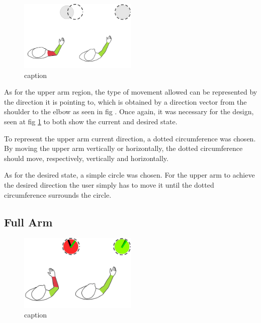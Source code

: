 \begin{figure}[!t]
    \begin{center}
        \includegraphics[width=0.5\textwidth]{imgs/upperarmfeedback.png}
    \end{center}
    \caption{caption}
    \label{fig:upperarmfeedback}
\end{figure}

As for the upper arm region, the type of movement allowed can be represented by the direction it is pointing to, which is obtained by a direction vector from the shoulder to the elbow as seen in fig .
Once again, it was necessary for the design, seen at fig \ref{fig:upperarmfeedback} to both show the current and desired state. 


To represent the upper arm current direction, a dotted circumference was chosen. By moving the upper arm vertically or horizontally, the dotted circumference should move, respectively, vertically and horizontally.


As for the desired state, a simple circle was chosen. For the upper arm to achieve the desired direction the user simply has to move it until the dotted circumference surrounds the circle.

\subsection{Full Arm}

\begin{figure}[!b]
    \begin{center}
        \includegraphics[width=0.5\textwidth]{imgs/fullarmfeedback.png}
    \end{center}
    \caption{caption}
    \label{fig:fullarmfeedback}
\end{figure}

